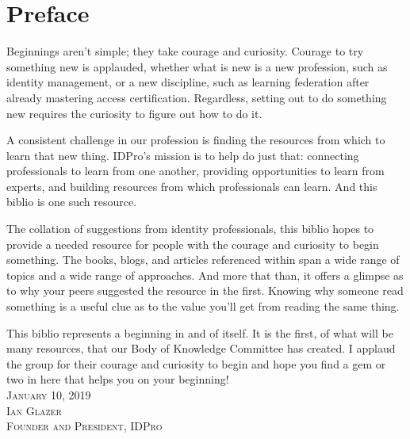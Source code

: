 \section{Preface}

Beginnings aren’t simple; they take courage and curiosity. Courage to try something new is applauded, whether what is new is a new profession, such as  identity management, or a new discipline, such as learning federation after already mastering access certification. Regardless, setting out to do something new requires the curiosity to figure out how to do it.

A consistent challenge in our profession is finding the resources from which to learn that new thing. IDPro’s mission is to help do just that: connecting professionals to learn from one another, providing opportunities to learn from experts, and building resources from which professionals can learn. And this biblio is one such resource.

The collation of suggestions from identity professionals, this biblio hopes to provide a needed resource for people with the courage and curiosity to begin something. The books, blogs, and articles referenced within span a wide range of topics and a wide range of approaches. And more that than, it offers a glimpse as to why your peers suggested the resource in the first. Knowing why someone read something is a useful clue as to the value you’ll get from reading the same thing.

This biblio represents a beginning in and of itself. It is the first, of what will be many resources, that our Body of Knowledge Committee has created. I applaud the group for their courage and curiosity to begin and hope you find a gem or two in here that helps you on your beginning!\\

\vspace{24pt}
{\setlength{\parindent}{0cm}
\textsc{
January 10, 2019\\
Ian Glazer\\
Founder and President, IDPro}
}